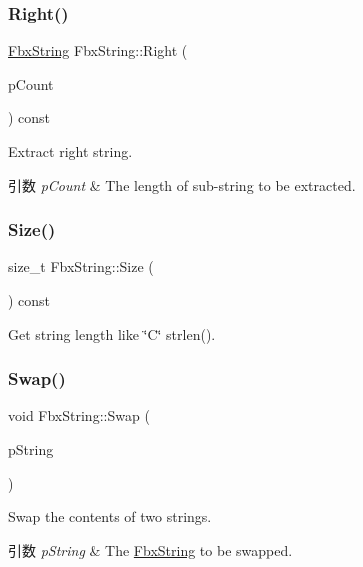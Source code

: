 \subsubsection{\texorpdfstring{Right()}{Right()}}
{\footnotesize\ttfamily \hyperlink{class_fbx_string}{Fbx\+String} Fbx\+String\+::\+Right (\begin{DoxyParamCaption}\item[{size\+\_\+t}]{p\+Count }\end{DoxyParamCaption}) const}

Extract right string. 
\begin{DoxyParams}{引数}
{\em p\+Count} & The length of sub-\/string to be extracted. \\
\hline
\end{DoxyParams}
\mbox{\label{class_fbx_string_afe2befa6b6caf1a4b0ceda5cebb9cb39}} 
\subsubsection{\texorpdfstring{Size()}{Size()}}
{\footnotesize\ttfamily size\+\_\+t Fbx\+String\+::\+Size (\begin{DoxyParamCaption}{ }\end{DoxyParamCaption}) const}



Get string length like \char`\"{}\+C\char`\"{} strlen(). 

\mbox{\label{class_fbx_string_a12d620f75a2e54100374dbedfc786ae8}} 
\subsubsection{\texorpdfstring{Swap()}{Swap()}}
{\footnotesize\ttfamily void Fbx\+String\+::\+Swap (\begin{DoxyParamCaption}\item[{\hyperlink{class_fbx_string}{Fbx\+String} \&}]{p\+String }\end{DoxyParamCaption})}

Swap the contents of two strings. 
\begin{DoxyParams}{引数}
{\em p\+String} & The \hyperlink{class_fbx_string}{Fbx\+String} to be swapped. \\
\hline
\end{DoxyParams}
\mbox{\label{class_fbx_string_aa8884e0a5e912d0f1c3a3c157d4787ff}} 
